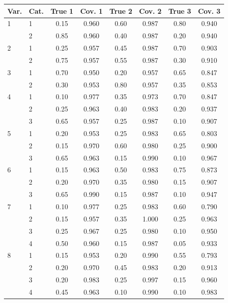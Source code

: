 \begin{table}[H]
\centering
\begin{tabular}{llcccccc}
  \toprule
\textbf{Var.} & \textbf{Cat.} & \textbf{True 1} & \textbf{Cov. 1} & \textbf{True 2} & \textbf{Cov. 2} & \textbf{True 3} & \textbf{Cov. 3} \\ 
  \midrule
1 & 1 & 0.15 & 0.960 & 0.60 & 0.987 & 0.80 & 0.940 \\ 
   & 2 & 0.85 & 0.960 & 0.40 & 0.987 & 0.20 & 0.940 \\ 
  2 & 1 & 0.25 & 0.957 & 0.45 & 0.987 & 0.70 & 0.903 \\ 
   & 2 & 0.75 & 0.957 & 0.55 & 0.987 & 0.30 & 0.910 \\ 
  3 & 1 & 0.70 & 0.950 & 0.20 & 0.957 & 0.65 & 0.847 \\ 
   & 2 & 0.30 & 0.953 & 0.80 & 0.957 & 0.35 & 0.853 \\ 
  4 & 1 & 0.10 & 0.977 & 0.35 & 0.973 & 0.70 & 0.847 \\ 
   & 2 & 0.25 & 0.963 & 0.40 & 0.983 & 0.20 & 0.937 \\ 
   & 3 & 0.65 & 0.957 & 0.25 & 0.987 & 0.10 & 0.907 \\ 
  5 & 1 & 0.20 & 0.953 & 0.25 & 0.983 & 0.65 & 0.803 \\ 
   & 2 & 0.15 & 0.970 & 0.60 & 0.980 & 0.25 & 0.900 \\ 
   & 3 & 0.65 & 0.963 & 0.15 & 0.990 & 0.10 & 0.967 \\ 
  6 & 1 & 0.15 & 0.963 & 0.50 & 0.983 & 0.75 & 0.873 \\ 
   & 2 & 0.20 & 0.970 & 0.35 & 0.980 & 0.15 & 0.907 \\ 
   & 3 & 0.65 & 0.990 & 0.15 & 0.987 & 0.10 & 0.947 \\ 
  7 & 1 & 0.10 & 0.977 & 0.25 & 0.983 & 0.60 & 0.790 \\ 
   & 2 & 0.15 & 0.957 & 0.35 & 1.000 & 0.25 & 0.963 \\ 
   & 3 & 0.25 & 0.967 & 0.25 & 0.980 & 0.10 & 0.950 \\ 
   & 4 & 0.50 & 0.960 & 0.15 & 0.987 & 0.05 & 0.933 \\ 
  8 & 1 & 0.15 & 0.953 & 0.20 & 0.990 & 0.55 & 0.793 \\ 
   & 2 & 0.20 & 0.970 & 0.45 & 0.983 & 0.20 & 0.913 \\ 
   & 3 & 0.20 & 0.983 & 0.25 & 0.997 & 0.15 & 0.960 \\ 
   & 4 & 0.45 & 0.963 & 0.10 & 0.990 & 0.10 & 0.983 \\ 

\end{tabular}
\end{table}
